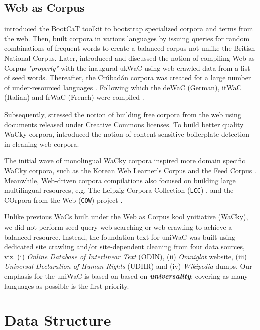 \documentclass[11pt]{article}
\begin{document}
\subsection{Web as Corpus}

 introduced the BootCaT toolkit to bootstrap specialized corpora and terms from the web. Then,  built corpora in various languages by issuing queries for random combinations of frequent words to create a balanced corpus not unlike the British National Corpus. Later,  introduced and discussed the notion of compiling Web as Corpus \emph{"properly"} with the inaugural ukWaC using web-crawled data from a list of seed words. Thereafter, the Crúbadán corpora was created for a large number of under-resourced languages \cite{scannell2007crubadan}. Following which the deWaC (German), itWaC (Italian) and frWaC (French) were compiled \cite{baroni2009wacky}. 

Subsequently,  stressed the notion of building free corpora from the web using documents released under Creative Commons licenses. To build better quality WaCky corpora,  introduced the notion of content-sensitive boilerplate detection in cleaning web corpora. 

The initial wave of monolingual WaCky corpora \cite{baroni2009wacky} inspired more domain specific WaCky corpora, such as the Korean Web Learner's Corpus \cite{dickinson2010korean} and the Feed Corpus \cite{minocha2013feed}. Meanwhile, Web-driven corpora compilations also focused on building large  multilingual resources, e.g. The Leipzig Corpora Collection (\texttt{LCC}) \cite{biemann2007leipzig}, and the COrpora from the Web (\texttt{COW}) project \cite{schaefer2012cow}.

Unlike previous WaCs built under the Web as Corpus kool ynitiative (WaCky), we did not perform seed query web-searching or web crawling to achieve a balanced resource. Instead, the foundation text for uniWaC was built using dedicated site crawling and/or site-dependent cleaning from four data sources, viz. (i) \emph{Online Database of Interlinear Text} (ODIN), (ii) \emph{Omniglot} website, (iii) \emph{Universal Declaration of Human Rights} (UDHR) and (iv) \emph{Wikipedia} dumps. Our emphasis for the uniWaC is based on based on \textbf{\emph{universality}}; covering as many languages as possible is the first priority.



\section{Data Structure}
\end{document}
